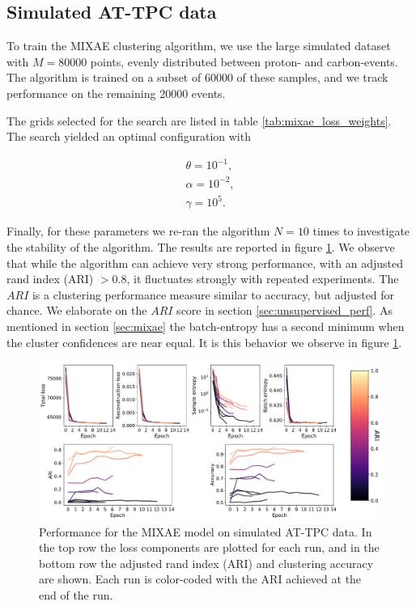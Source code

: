 \documentclass[preprint,12pt]{elsarticle}
\begin{document}
\subsection{Simulated AT-TPC data}

To train the MIXAE clustering algorithm, we use the large simulated dataset with $M=80000$ points, evenly distributed between proton- and carbon-events. The algorithm is trained on a subset of $60000$ of these samples, and we track performance on the remaining $20000$ events. 

The grids selected for the search are listed in table \ref{tab:mixae_loss_weights}. The search yielded an optimal configuration with 

\begin{align}
\theta = 10^{-1}, \\
\alpha = 10^{-2}, \\
\gamma = 10^5.
\end{align}

Finally, for these parameters we re-ran the algorithm $N=10$ times to investigate the stability of the algorithm. The results are reported in figure \ref{fig:mixae_sim}. We observe that while the algorithm can achieve very strong performance, with an adjusted rand index (ARI) $ > 0.8$, it fluctuates strongly with repeated experiments. The $ARI$ is a clustering performance measure similar to accuracy, but adjusted for chance. We elaborate on the $ARI$ score in section \ref{sec:unsupervised_perf}. As mentioned in section \ref{sec:mixae} the batch-entropy has a second minimum when the cluster confidences are near equal. It is this behavior we observe in figure \ref{fig:mixae_sim}.

\begin{figure}[H]
\centering
\includegraphics[width=\textwidth]{./plots/sim_mixae.pdf}
\caption[Clustering performance of MIXAE on simulated AT-TPC data]{Performance for the MIXAE model on simulated AT-TPC data. In the top row the loss components are plotted for each run, and in the bottom row the adjusted rand index (ARI) and clustering accuracy are shown. Each run is color-coded with the ARI achieved at the end of the run. }\label{fig:mixae_sim}
\end{figure}
\end{document}
